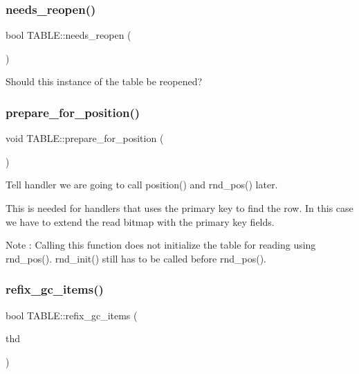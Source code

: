 \subsubsection{\texorpdfstring{needs\+\_\+reopen()}{needs\_reopen()}}
{\footnotesize\ttfamily bool T\+A\+B\+L\+E\+::needs\+\_\+reopen (\begin{DoxyParamCaption}{ }\end{DoxyParamCaption})\hspace{0.3cm}{\ttfamily [inline]}}

Should this instance of the table be reopened? \mbox{\label{structTABLE_aeae1505f7281ef739f97287727b4685e}} 
\subsubsection{\texorpdfstring{prepare\+\_\+for\+\_\+position()}{prepare\_for\_position()}}
{\footnotesize\ttfamily void T\+A\+B\+L\+E\+::prepare\+\_\+for\+\_\+position (\begin{DoxyParamCaption}\item[{void}]{ }\end{DoxyParamCaption})}

Tell handler we are going to call position() and rnd\+\_\+pos() later.

This is needed for handlers that uses the primary key to find the row. In this case we have to extend the read bitmap with the primary key fields.

\begin{DoxyNote}{Note}
\+: Calling this function does not initialize the table for reading using rnd\+\_\+pos(). rnd\+\_\+init() still has to be called before rnd\+\_\+pos(). 
\end{DoxyNote}
\mbox{\label{structTABLE_a76b3b77275d88395fda596ed7b99ceee}} 
\subsubsection{\texorpdfstring{refix\+\_\+gc\+\_\+items()}{refix\_gc\_items()}}
{\footnotesize\ttfamily bool T\+A\+B\+L\+E\+::refix\+\_\+gc\+\_\+items (\begin{DoxyParamCaption}\item[{T\+HD $\ast$}]{thd }\end{DoxyParamCaption})}

